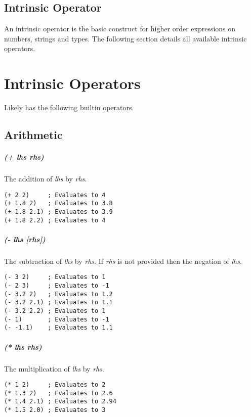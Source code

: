 \documentclass[twoside=false, numbers=noenddot]{scrbook}
\begin{document}
\section{Intrinsic Operator}
An intrinsic operator is the basic construct for higher order expressions on numbers, strings and types.
The following section details all available intrinsic operators.

\chapter{Intrinsic Operators}
Likely has the following builtin operators.

\section{Arithmetic}
\paragraph{(+ \emph{lhs} \emph{rhs})}
The addition of \emph{lhs} by \emph{rhs}.

\begin{verbatim}
(+ 2 2)     ; Evaluates to 4
(+ 1.8 2)   ; Evaluates to 3.8
(+ 1.8 2.1) ; Evaluates to 3.9
(+ 1.8 2.2) ; Evaluates to 4
\end{verbatim}

\paragraph{(- \emph{lhs} [\emph{rhs}])}
The subtraction of \emph{lhs} by \emph{rhs}.
If \emph{rhs} is not provided then the negation of \emph{lhs}.

\begin{verbatim}
(- 3 2)     ; Evaluates to 1
(- 2 3)     ; Evaluates to -1
(- 3.2 2)   ; Evaluates to 1.2
(- 3.2 2.1) ; Evaluates to 1.1
(- 3.2 2.2) ; Evaluates to 1
(- 1)       ; Evaluates to -1
(- -1.1)    ; Evaluates to 1.1
\end{verbatim}

\paragraph{(* \emph{lhs} \emph{rhs})}
The multiplication of \emph{lhs} by \emph{rhs}.

\begin{verbatim}
(* 1 2)     ; Evaluates to 2
(* 1.3 2)   ; Evaluates to 2.6
(* 1.4 2.1) ; Evaluates to 2.94
(* 1.5 2.0) ; Evaluates to 3
\end{verbatim}
\end{document}
